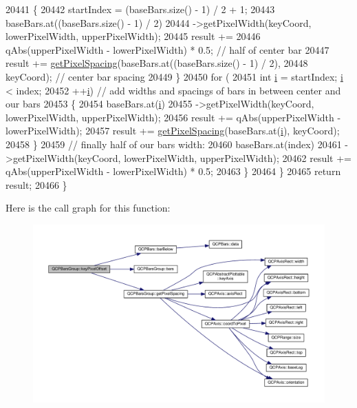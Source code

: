 \begin{DoxyCode}
20441       \{
20442         startIndex = (baseBars.size() - 1) / 2 + 1;
20443         baseBars.at((baseBars.size() - 1) / 2)
20444             ->getPixelWidth(keyCoord, lowerPixelWidth, upperPixelWidth);
20445         result +=
20446             qAbs(upperPixelWidth - lowerPixelWidth) * 0.5; \textcolor{comment}{// half of center bar}
20447         result += \hyperlink{class_q_c_p_bars_group_a0beccd41bc3841a4c5b284823bc7d2de}{getPixelSpacing}(baseBars.at((baseBars.size() - 1) / 2),
20448                                   keyCoord); \textcolor{comment}{// center bar spacing}
20449       \}
20450       \textcolor{keywordflow}{for} (
20451           \textcolor{keywordtype}{int} \hyperlink{_comparision_pictures_2_createtest_image_8m_a6f6ccfcf58b31cb6412107d9d5281426}{i} = startIndex; \hyperlink{_comparision_pictures_2_createtest_image_8m_a6f6ccfcf58b31cb6412107d9d5281426}{i} < index;
20452           ++\hyperlink{_comparision_pictures_2_createtest_image_8m_a6f6ccfcf58b31cb6412107d9d5281426}{i}) \textcolor{comment}{// add widths and spacings of bars in between center and our bars}
20453       \{
20454         baseBars.at(\hyperlink{_comparision_pictures_2_createtest_image_8m_a6f6ccfcf58b31cb6412107d9d5281426}{i})
20455             ->getPixelWidth(keyCoord, lowerPixelWidth, upperPixelWidth);
20456         result += qAbs(upperPixelWidth - lowerPixelWidth);
20457         result += \hyperlink{class_q_c_p_bars_group_a0beccd41bc3841a4c5b284823bc7d2de}{getPixelSpacing}(baseBars.at(\hyperlink{_comparision_pictures_2_createtest_image_8m_a6f6ccfcf58b31cb6412107d9d5281426}{i}), keyCoord);
20458       \}
20459       \textcolor{comment}{// finally half of our bars width:}
20460       baseBars.at(index)
20461           ->getPixelWidth(keyCoord, lowerPixelWidth, upperPixelWidth);
20462       result += qAbs(upperPixelWidth - lowerPixelWidth) * 0.5;
20463     \}
20464   \}
20465   \textcolor{keywordflow}{return} result;
20466 \}
\end{DoxyCode}


Here is the call graph for this function\+:\nopagebreak
\begin{figure}[H]
\begin{center}
\leavevmode
\includegraphics[width=350pt]{class_q_c_p_bars_group_a8e2ca6002e7bab49670144d048a2bcc9_cgraph}
\end{center}
\end{figure}




